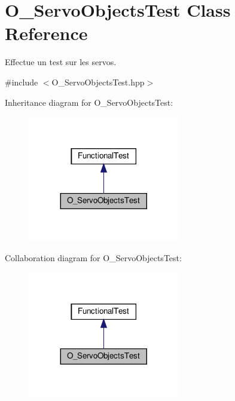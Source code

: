 \hypertarget{classO__ServoObjectsTest}{}\section{O\+\_\+\+Servo\+Objects\+Test Class Reference}
\label{classO__ServoObjectsTest}


Effectue un test sur les servos.  




{\ttfamily \#include $<$O\+\_\+\+Servo\+Objects\+Test.\+hpp$>$}



Inheritance diagram for O\+\_\+\+Servo\+Objects\+Test\+:
\nopagebreak
\begin{figure}[H]
\begin{center}
\leavevmode
\includegraphics[width=188pt]{classO__ServoObjectsTest__inherit__graph}
\end{center}
\end{figure}


Collaboration diagram for O\+\_\+\+Servo\+Objects\+Test\+:
\nopagebreak
\begin{figure}[H]
\begin{center}
\leavevmode
\includegraphics[width=188pt]{classO__ServoObjectsTest__coll__graph}
\end{center}
\end{figure}
